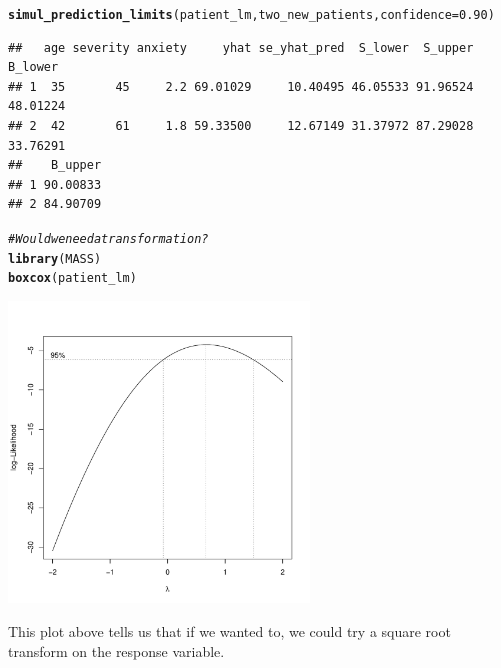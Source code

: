 \documentclass{article}\usepackage[]{graphicx}\usepackage[]{color}
\makeatletter
\newcommand{\hlnum}[1]{\textcolor[rgb]{0.686,0.059,0.569}{#1}}%
\newcommand{\hlcom}[1]{\textcolor[rgb]{0.678,0.584,0.686}{\textit{#1}}}%
\newcommand{\hlstd}[1]{\textcolor[rgb]{0.345,0.345,0.345}{#1}}%
\newcommand{\hlkwc}[1]{\textcolor[rgb]{0.333,0.667,0.333}{#1}}%
\newcommand{\hlkwd}[1]{\textcolor[rgb]{0.737,0.353,0.396}{\textbf{#1}}}%
\newenvironment{kframe}{%
 \def\at@end@of@kframe{}%
 \ifinner\ifhmode%
  \def\at@end@of@kframe{\end{minipage}}%
  \begin{minipage}{\columnwidth}%
 \fi\fi%
 \def\FrameCommand##1{\hskip\@totalleftmargin \hskip-\fboxsep
 \colorbox{shadecolor}{##1}\hskip-\fboxsep
     \hskip-\linewidth \hskip-\@totalleftmargin \hskip\columnwidth}%
 \MakeFramed {\advance\hsize-\width
   \@totalleftmargin\z@ \linewidth\hsize
   \@setminipage}}%
 {\par\unskip\endMakeFramed%
 \at@end@of@kframe}
\newenvironment{knitrout}{}{} %
\makeatother
\begin{document}
\begin{knitrout}
\begin{kframe}
\begin{alltt}
\hlkwd{simul_prediction_limits}\hlstd{(patient_lm, two_new_patients,} \hlkwc{confidence} \hlstd{=} \hlnum{0.90}\hlstd{)}
\end{alltt}
\begin{verbatim}
##   age severity anxiety     yhat se_yhat_pred  S_lower  S_upper  B_lower
## 1  35       45     2.2 69.01029     10.40495 46.05533 91.96524 48.01224
## 2  42       61     1.8 59.33500     12.67149 31.37972 87.29028 33.76291
##    B_upper
## 1 90.00833
## 2 84.90709
\end{verbatim}
\begin{alltt}
\hlcom{# Would we need a transformation?}
\hlkwd{library}\hlstd{(MASS)}
\hlkwd{boxcox}\hlstd{(patient_lm)}
\end{alltt}
\end{kframe}
\includegraphics[width=0.6\textwidth]{figure/unnamed-chunk-1-3} 

\end{knitrout}

This plot above tells us that if we wanted to, we could try a square root transform on the response variable.
\end{document}

